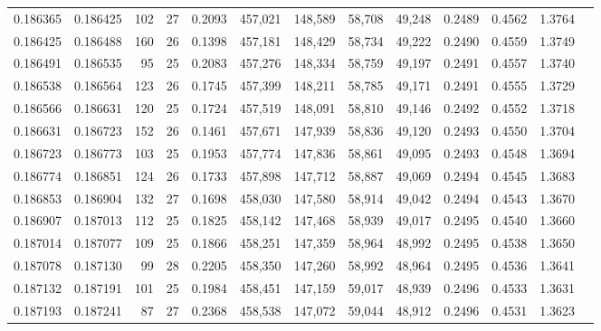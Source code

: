 \begin{tabular}{rrrrrrrrrrrrr}
0.186365 & 0.186425 & 102 &  27 &                                     0.2093 & 457,021 & 148,589 &  58,708 &  49,248 & 0.2489 & 0.4562 & 1.3764 \\
0.186425 & 0.186488 & 160 &  26 &                                     0.1398 & 457,181 & 148,429 &  58,734 &  49,222 & 0.2490 & 0.4559 & 1.3749 \\
0.186491 & 0.186535 &  95 &  25 &                                     0.2083 & 457,276 & 148,334 &  58,759 &  49,197 & 0.2491 & 0.4557 & 1.3740 \\
0.186538 & 0.186564 & 123 &  26 &                                     0.1745 & 457,399 & 148,211 &  58,785 &  49,171 & 0.2491 & 0.4555 & 1.3729 \\
0.186566 & 0.186631 & 120 &  25 &                                     0.1724 & 457,519 & 148,091 &  58,810 &  49,146 & 0.2492 & 0.4552 & 1.3718 \\
0.186631 & 0.186723 & 152 &  26 &                                     0.1461 & 457,671 & 147,939 &  58,836 &  49,120 & 0.2493 & 0.4550 & 1.3704 \\
0.186723 & 0.186773 & 103 &  25 &                                     0.1953 & 457,774 & 147,836 &  58,861 &  49,095 & 0.2493 & 0.4548 & 1.3694 \\
0.186774 & 0.186851 & 124 &  26 &                                     0.1733 & 457,898 & 147,712 &  58,887 &  49,069 & 0.2494 & 0.4545 & 1.3683 \\
0.186853 & 0.186904 & 132 &  27 &                                     0.1698 & 458,030 & 147,580 &  58,914 &  49,042 & 0.2494 & 0.4543 & 1.3670 \\
0.186907 & 0.187013 & 112 &  25 &                                     0.1825 & 458,142 & 147,468 &  58,939 &  49,017 & 0.2495 & 0.4540 & 1.3660 \\
0.187014 & 0.187077 & 109 &  25 &                                     0.1866 & 458,251 & 147,359 &  58,964 &  48,992 & 0.2495 & 0.4538 & 1.3650 \\
0.187078 & 0.187130 &  99 &  28 &                                     0.2205 & 458,350 & 147,260 &  58,992 &  48,964 & 0.2495 & 0.4536 & 1.3641 \\
0.187132 & 0.187191 & 101 &  25 &                                     0.1984 & 458,451 & 147,159 &  59,017 &  48,939 & 0.2496 & 0.4533 & 1.3631 \\
0.187193 & 0.187241 &  87 &  27 &                                     0.2368 & 458,538 & 147,072 &  59,044 &  48,912 & 0.2496 & 0.4531 & 1.3623 \\

\end{tabular}
